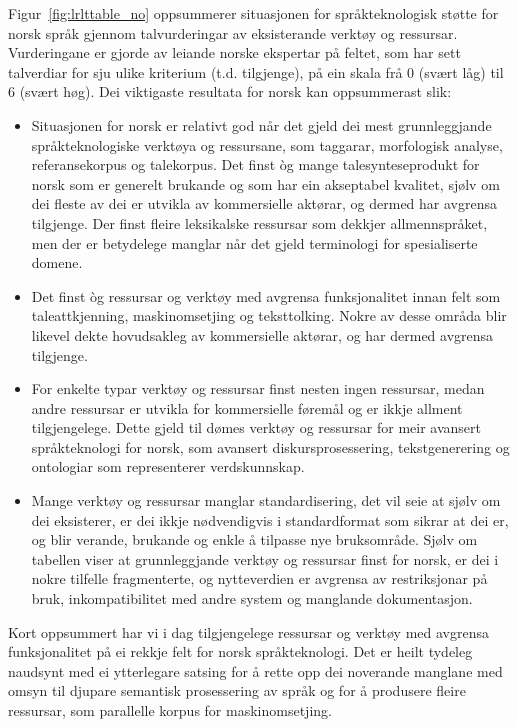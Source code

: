 \begin{multicols}{2}
Figur~\ref{fig:lrlttable_no} oppsummerer situasjonen for språkteknologisk støtte for norsk språk gjennom talvurderingar av eksisterande verktøy og ressursar. Vurderingane er gjorde av leiande norske ekspertar på feltet, som har sett talverdiar for sju ulike kriterium (t.d. tilgjenge), på ein skala frå 0 (svært låg) til 6 (svært høg). 
Dei viktigaste resultata for norsk kan oppsummerast slik: 

\begin{itemize}
\item Situasjonen for norsk er relativt god når det gjeld dei mest grunnleggjande språkteknologiske verktøya og ressursane, som taggarar, morfologisk analyse, referansekorpus og talekorpus.
Det finst òg mange talesynteseprodukt for norsk som er generelt
brukande og som har ein akseptabel kvalitet, sjølv om dei fleste av
dei er utvikla av kommersielle aktørar, og dermed har avgrensa
tilgjenge. Der finst fleire leksikalske ressursar som dekkjer
allmennspråket, men der er betydelege manglar når det gjeld
terminologi for spesialiserte domene.

\smallskip
\item Det finst òg ressursar og verktøy med avgrensa funksjonalitet
  innan felt som taleattkjenning, maskinomsetjing og
  teksttolking. Nokre av desse områda blir likevel dekte hovudsakleg
  av kommersielle aktørar, og har dermed avgrensa tilgjenge.

\smallskip
\item For enkelte typar verktøy og ressursar finst nesten ingen ressursar, medan andre ressursar er utvikla for kommersielle føremål og er ikkje allment tilgjengelege. 
Dette gjeld til dømes verktøy og ressursar for meir avansert
språkteknologi for norsk, som avansert diskursprosessering,
tekstgenerering og ontologiar som representerer verdskunnskap.

\smallskip
\item Mange verktøy og ressursar manglar standardisering, det vil seie at sjølv om dei eksisterer, er dei ikkje nødvendigvis i standardformat som sikrar at dei er, og blir verande, brukande og enkle å tilpasse nye bruksområde.
Sjølv om tabellen viser at grunnleggjande verktøy og ressursar finst for norsk, er dei i nokre tilfelle fragmenterte, og nytteverdien er avgrensa av restriksjonar på bruk, inkompatibilitet med andre system og manglande dokumentasjon. 
\end{itemize}

\medskip 
Kort oppsummert har vi i dag tilgjengelege ressursar og verktøy med avgrensa funksjonalitet på ei rekkje felt for norsk språkteknologi.
Det er heilt tydeleg naudsynt med ei ytterlegare satsing for å rette opp dei noverande manglane med omsyn til djupare semantisk prosessering av språk og for å produsere fleire ressursar, som parallelle korpus for maskinomsetjing.


\end{multicols}
